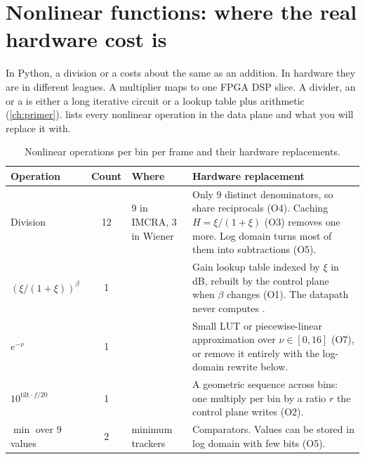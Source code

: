 \section{Nonlinear functions: where the real hardware cost is}\label{sec:workload:nonlinear}

In Python, a division or a \code{**} costs about the same as an addition. In
hardware they are in different leagues. A multiplier maps to one FPGA DSP slice.
A divider, an  or a  is either a long iterative circuit or a
lookup table plus arithmetic (\cref{ch:primer}). 
lists every nonlinear operation in the data plane and what you will replace it
with.

\begin{table}[htbp]
\centering\footnotesize
\caption{Nonlinear operations per bin per frame and their hardware replacements.}
\label{tab:workload:nonlinear}
\begin{tabularx}{\textwidth}{@{}lcLL@{}}
\toprule
Operation & Count & Where & Hardware replacement \\
\midrule
Division & 12 & 9 in IMCRA, 3 in Wiener & Only 9 distinct denominators, so share reciprocals (O4). Caching $H=\xi/(1+\xi)$ (O3) removes one more. Log domain turns most of them into subtractions (O5). \\
$(\xi/(1+\xi))^{\beta}$ & 1 &  & Gain lookup table indexed by $\xi$ in dB, rebuilt by the control plane when $\beta$ changes (O1). The datapath never computes . \\
$e^{-\nu}$ & 1 &  & Small LUT or piecewise-linear approximation over $\nu\in[0,16]$ (O7), or remove it entirely with the log-domain rewrite below. \\
$10^{\text{tilt}\cdot f/20}$ & 1 &  & A geometric sequence across bins: one multiply per bin by a ratio $r$ the control plane writes (O2). \\
$\min$ over 9 values & 2 & minimum trackers & Comparators. Values can be stored in log domain with few bits (O5). \\
\bottomrule
\end{tabularx}
\end{table}

